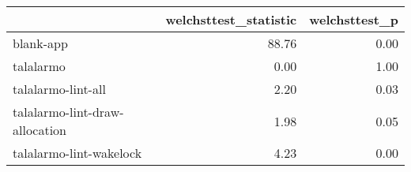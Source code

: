 \begin{tabular}{lrr}
\toprule
{} &  welchsttest\_statistic &  welchsttest\_p \\
\midrule
blank-app                      &                  88.76 &           0.00 \\
talalarmo                      &                   0.00 &           1.00 \\
talalarmo-lint-all             &                   2.20 &           0.03 \\
talalarmo-lint-draw-allocation &                   1.98 &           0.05 \\
talalarmo-lint-wakelock        &                   4.23 &           0.00 \\
\bottomrule
\end{tabular}
